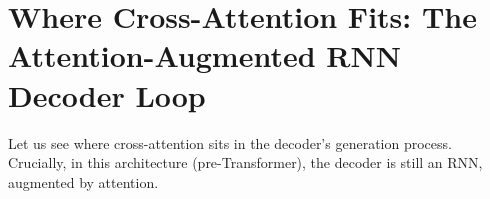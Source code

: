 \documentclass{article}
\begin{document}
    
    





\section{Where Cross-Attention Fits: The Attention-Augmented RNN Decoder Loop}

Let us see where cross-attention sits in the decoder's generation process. Crucially, in this architecture (pre-Transformer), the decoder is still an RNN, augmented by attention.
\end{document}
